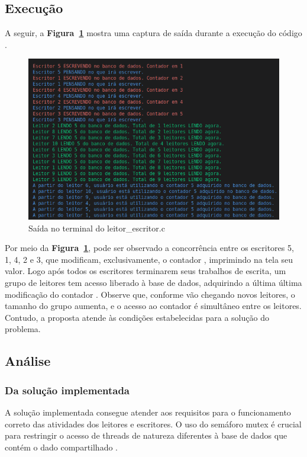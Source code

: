 \documentclass[
	12pt,				%
	openright,			%
	oneside,			%
	a4paper,			%
	chapter=TITLE,		%
	english,			%
	french,				%
	spanish,			%
	brazil				%
	]{abntex2}
\theoremstyle{definition}
\begin{document}
\subsection{Execução}

A seguir, a \textbf{Figura~\ref{fig:1}} mostra uma captura de saída durante a execução do código .

\begin{figure}[h]
    \centering
    \includegraphics[width=1.0\textwidth]{imagens/out_leitor_escritor.png}
	\caption{Saída no terminal do leitor\_escritor.c}
	\label{fig:1}
\end{figure}

Por meio da \textbf{Figura~\ref{fig:1}}, pode ser observado a concorrência entre os escritores 5, 1, 4, 2 e 3, que modificam, exclusivamente, o contador , imprimindo na tela seu valor. Logo após todos os escritores terminarem seus trabalhos de escrita, um grupo de leitores tem acesso liberado à base de dados, adquirindo a última última modificação do contador . Observe que, conforme vão chegando novos leitores, o tamanho do grupo aumenta, e o acesso ao contador  é simultâneo entre os leitores. Contudo, a proposta atende às condições estabelecidas para a solução do problema.

\subsection{Análise}
\subsubsection{Da solução implementada}

A solução implementada consegue atender aos requisitos para o funcionamento correto das atividades dos leitores e escritores. O uso do semáforo mutex  é crucial para restringir o acesso de threads de natureza diferentes à base de dados que contém o dado compartilhado . 
\end{document}
